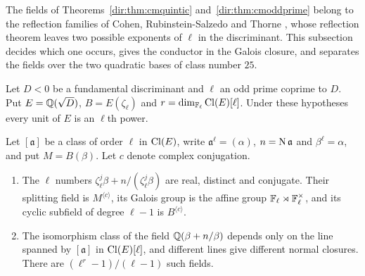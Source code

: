 The fields of Theorems~\ref{dir:thm:cmquintic} and~\ref{dir:thm:cmoddprime} belong to the reflection
families of Cohen, Rubinstein-Salzedo and Thorne
\cite{CohenRubinsteinSalzedoThorne2015Identities,CohenThorneDihedral}, whose reflection
theorem leaves two possible exponents of $\ell$ in the discriminant. This subsection
decides which one occurs, gives the conductor in the Galois closure, and separates the
fields over the two quadratic bases of class number $25$.

Let $D<0$ be a fundamental discriminant and $\ell$ an odd prime coprime to $D$. Put
$E=\mathbb{Q}(\sqrt D)$, $B=E(\zeta_\ell)$ and $r=\dim_{\mathbb{F}_\ell}\operatorname{Cl}(E)[\ell]$. Under these
hypotheses every unit of $E$ is an $\ell$th power.

\begin{proposition}\label{dir:prop:reflection}
Let $[\mathfrak a]$ be a class of order $\ell$ in $\operatorname{Cl}(E)$, write
$\mathfrak a^\ell=(\alpha)$, $n=\operatorname{N}\mathfrak a$ and $\beta^\ell=\alpha$, and put
$M=B(\beta)$. Let $c$ denote complex conjugation.
\begin{enumerate}[label=\textup{(\roman*)}]
\item The $\ell$ numbers $\zeta_\ell^j\beta+n/(\zeta_\ell^j\beta)$ are real, distinct
 and conjugate. Their splitting field is $M^{\langle c\rangle}$, its Galois group is
 the affine group $\mathbb{F}_\ell\rtimes\mathbb{F}_\ell^\times$, and its cyclic subfield of degree
 $\ell-1$ is $B^{\langle c\rangle}$.
\item The isomorphism class of the field $\mathbb{Q}(\beta+n/\beta)$ depends only on the line
 spanned by $[\mathfrak a]$ in $\operatorname{Cl}(E)[\ell]$, and different lines give different
 normal closures. There are $(\ell^r-1)/(\ell-1)$ such fields.
\end{enumerate}
\end{proposition}

